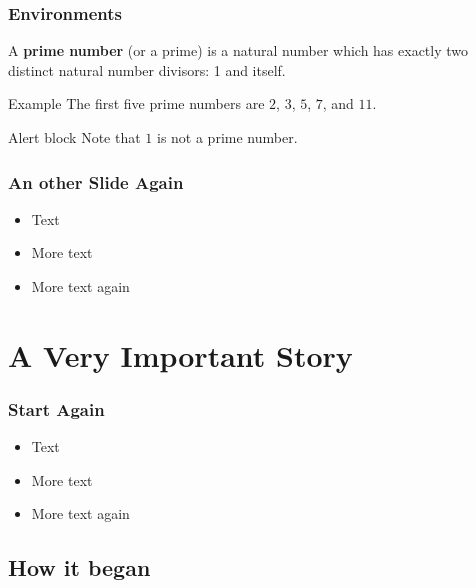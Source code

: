 \documentclass{beamer}
\begin{document}

\begin{frame}
\frametitle{Environments}
  \begin{definition}
    A \textbf{prime number} (or a prime) is a natural number which has exactly two distinct natural number divisors: 1 and itself. 
  \end{definition}

  \begin{exampleblock}{Example}
    The first five prime numbers are $2$, $3$, $5$, $7$, and $11$.
  \end{exampleblock}

  \begin{alertblock}{Alert block}
    Note that $1$ is not a prime number.
  \end{alertblock}
\end{frame}


\begin{frame} 
\frametitle{An other Slide Again}
  \begin{itemize}
  \item Text
  \item More text
  \item More text again
  \end{itemize}
\end{frame}

\section{A Very Important Story}

\begin{frame} 
\frametitle{Start Again}
  \begin{itemize}
  \item Text
  \item More text
  \item More text again
  \end{itemize}
\end{frame}

\subsection{How it began}
\end{document}
